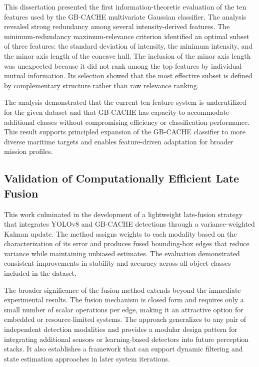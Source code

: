 \documentclass{erauthesis}
\begin{document}
This dissertation presented the first information-theoretic evaluation of the ten features used by the GB-CACHE multivariate Gaussian classifier. The analysis revealed strong redundancy among several intensity-derived features. The minimum-redundancy maximum-relevance criterion identified an optimal subset of three features: the standard deviation of intensity, the minimum intensity, and the minor axis length of the concave hull. The inclusion of the minor axis length was unexpected because it did not rank among the top features by individual mutual information. Its selection showed that the most effective subset is defined by complementary structure rather than raw relevance ranking.

The analysis demonstrated that the current ten-feature system is underutilized for the given dataset and that GB-CACHE has capacity to accommodate additional classes without compromising efficiency or classification performance.
This result supports principled expansion of the GB-CACHE classifier to more diverse maritime targets and enables feature-driven adaptation for broader mission profiles.

\subsection{Validation of Computationally Efficient Late Fusion}

This work culminated in the development of a lightweight late-fusion strategy that integrates YOLOv8 and GB-CACHE detections through a variance-weighted Kalman update. The method assigns weights to each modality based on the characterization of its error and produces fused bounding-box edges that reduce variance while maintaining unbiased estimates. The evaluation demonstrated consistent improvements in stability and accuracy across all object classes included in the dataset.

The broader significance of the fusion method extends beyond the immediate experimental results. The fusion mechanism is closed form and requires only a small number of scalar operations per edge, making it an attractive option for embedded or resource-limited systems. The approach generalizes to any pair of independent detection modalities and provides a modular design pattern for integrating additional sensors or learning-based detectors into future perception stacks. It also establishes a framework that can support dynamic filtering and state estimation approaches in later system iterations.
\end{document}
